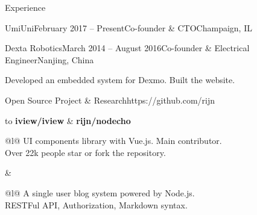 \documentclass{resume} %
\begin{document}
\begin{rSection}{Experience}
\begin{rSubsection}{UmiUni}{February 2017 -- Present}{Co-founder \& CTO}{Champaign, IL}
\end{rSubsection}

\begin{rSubsection}{Dexta Robotics}{March 2014 -- August 2016}{Co-founder \& Electrical Engineer}{Nanjing, China}

\item Developed an embedded system for Dexmo. Built the website.

\end{rSubsection}



\end{rSection}


\begin{rSection}{Open Source Project \& Research}{https://github.com/rijn}

\begin{tabu} to 
{\bf iview/iview} & {\bf rijn/nodecho}\\
\begin{tabu}{@{}l@{}}
	UI components library with Vue.js. Main contributor. \\
	Over 22k people star or fork the repository.
\end{tabu}
&
\begin{tabu}{@{}l@{}}
	A single user blog system powered by Node.js.\\
	RESTFul API, Authorization, Markdown syntax.\\
\end{tabu}\\
\end{tabu}

\end{rSection}
\end{document}
